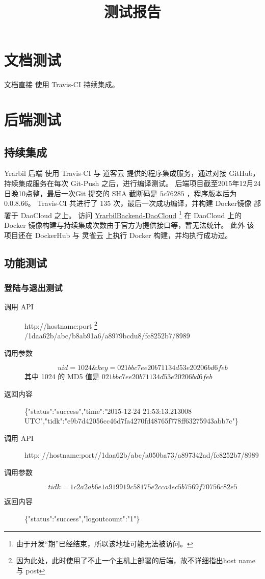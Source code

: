 \documentclass[UTF8]{report}
\title{测试报告}
\begin{document}
    \maketitle
    
    
    \tableofcontents
    \chapter{文档测试}
    文档直接 使用 Travis-CI 持续集成。
    
    \chapter{后端测试}
    \section{持续集成}
    Yrarbil 后端 使用 Travis-CI 与 道客云 提供的程序集成服务，通过对接 GitHub，持续集成服务在每次 Git-Push 之后，进行编译测试。
    后端项目截至2015年12月24日晚10点整，最后一次Git 提交的 SHA 截断码是 $5c76285$ ，程序版本后为 0.0.8.66。
    Travis-CI 共进行了 135 次，最后一次成功编译，并构建 Docker镜像 部署于 DaoCloud 之上。
    访问 \href{http://qinka-yrarbilbackend.daoapp.io}{YrarbilBackend-DaoCloud} 
    \footnote{由于开发“期”已经结束，所以该地址可能无法被访问。}
    在 DaoCloud 上的 Docker 镜像构建与持续集成次数由于官方为提供接口等，暂无法统计。
    此外 该项目还在 DockerHub 与 灵雀云 上执行 Docker 构建，并均执行成功过。
    \section{功能测试}
    \subsection{登陆与退出测试}
    \begin{description}
        \item[调用 API] http://hostname:port
        \footnote{因为此处，此时使用了不止一个主机上部署的后端，故不详细指出host name 与 post }
        /1daa62b/abc/b8ab91a6/a8979bcdu8/fc8252b7/8989
        \item[调用参数] $$uid=1024\&key=021bbc7ee20b71134d53e20206bd6feb$$
        其中 1024 的 MD5 值是 $021bbc7ee20b71134d53e20206bd6feb$
        \item[返回内容] \{"status":"success","time":"2015-12-24 21:53:13.213008 UTC","tidk":"e9b7d42056cc46d7fa4270fd48765f778ff63275943abb7c"\}        
    \end{description}
    \begin{description}
        \item[调用 API]
        http:       //hostname:port//1daa62b/abc/a050ba73/a897342ad/fc8252b7/8989
        \item[调用参数] $$tidk=1c2a2ab6e1a919919c58175e2cca4ec5b7569f70756c82e5$$
        \item[返回内容] \{"status":"success","logoutcount":"1"\}
    \end{description}
\end{document}
